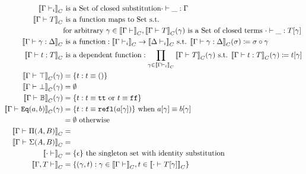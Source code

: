 \begin{align*}
  \denotesC{\goodCtx{\Gm}{i}} & \text{ is a Set of closed substitution} \goodSub{\cdot}{\_}{\Gm} \\
  \denotesC{\goodType{\Gm}{T}{}} & \text{ is a function maps to Set s.t.} \\
  & \text{for arbitrary } \gm \in \denotesC{\goodCtx{\Gm}{}}, \denotesC{\goodType{\Gm}{T}{}}(\gm) \text{ is a Set of closed terms } \goodTerm{\cdot}{\_}{\sub{T}{\gm}} \\ 
  \denotesC{\goodSub{\Gm}{\gm}{\Delta}} & \text{ is a function}: \denotesC{\goodCtx{\Gm}{i}} \to \denotesC{\goodCtx{\Delta}{i}} \text{ s.t. } \denotesC{\goodSub{\Gm}{\gm}{\Delta}}(\sigma) \coloneqq \SubstComp{\sigma}{\gm} \\
  \denotesC{\goodTerm{\Gm}{t}{T}} & \text{ is a dependent function}: \prod_{\gm \in \denotesC{\goodCtx{\Gm}{i}}}\denotesC{\goodType{\Gm}{T}{}}(\gm)  \text{ s.t. } \denotesC{\goodTerm{\Gm}{t}{T}}(\gm) \coloneqq \sub{t}{\gm} \\
  \denotesC{\goodType{\Gm}{\top}{}}(\gm) &= \{t : t \equiv \unit \} \\
  \denotesC{\goodType{\Gm}{\bot}{}}(\gm) &= \emptyset \\
  \denotesC{\goodType{\Gm}{\cB}{}}(\gm) &= \{t : t \equiv \true \text{ or } t \equiv\false \} \\
  \denotesC{\goodType{\Gm}{\TyId{a}{b}}{}}(\gm) &= \{t : t \equiv \eqrefl{\sub{a}{\gm}} \} \text{ when } \sub{a}{\gm} \equiv \sub{b}{\gm} \\ 
  &= \emptyset \text{ otherwise } \\ 
  \denotesC{\goodType{\Gm}{\TyPi{A}{B}}{}} &= \\
  \denotesC{\goodType{\Gm}{\TySigma{A}{B}}{}} &= \\
  \denotesC{\goodCtx{\cdot}{}} &= \{\SubstEmp\} \text{  the singleton set with identity substitution} \\ 
  \denotesC{\goodCtx{\Gm, T}{}} &= \{ (\gamma , t) : \gamma \in \denotesC{\goodCtx{\Gm}{}}, t \in \denotesC{\goodType{\cdot}{\sub{T}{\gm}}{}}  \} \\

\end{align*}
